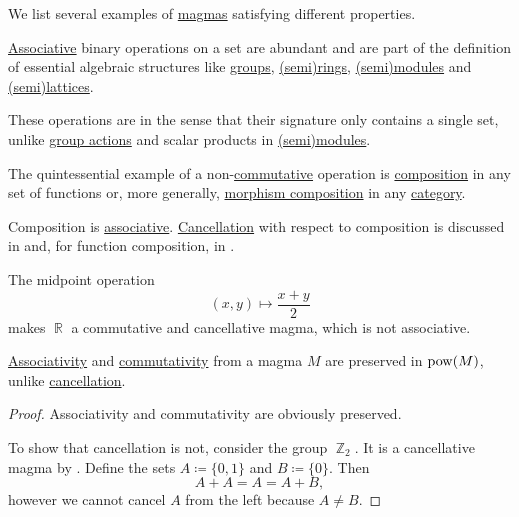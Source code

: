 \begin{example}\label{ex:def:magma}
  We list several examples of \hyperref[def:magma]{magmas} satisfying different properties.

  \begin{thmenum}
     \hyperref[eq:def:magma/associative]{Associative} binary operations on a set are abundant and are part of the definition of essential algebraic structures like \hyperref[def:group]{groups}, \hyperref[def:semiring]{(semi)rings}, \hyperref[def:semimodule]{(semi)modules} and \hyperref[def:semilattice]{(semi)lattices}.

    These operations are  in the sense that their signature only contains a single set, unlike \hyperref[def:group_action]{group actions} and scalar products in \hyperref[def:semimodule]{(semi)modules}.

     The quintessential example of a non-\hyperref[def:magma/commutative]{commutative} operation is \hyperref[def:multi_valued_function/composition]{composition} in any set of functions or, more generally, \hyperref[def:category/composition]{morphism composition} in any \hyperref[def:category]{category}.

    Composition is \hyperref[def:magma/associative]{associative}. \hyperref[def:magma/cancellative]{Cancellation} with respect to composition is discussed in  and, for function composition, in .

     The midpoint operation
    \begin{equation*}
      (x, y) \mapsto \dfrac {x + y} 2
    \end{equation*}
    makes \( \BbbR \) a commutative and cancellative magma, which is not associative.
  \end{thmenum}
\end{example}

\begin{proposition}\label{thm:power_set_magma_preservation}
  \hyperref[def:magma/associative]{Associativity} and \hyperref[def:magma/commutative]{commutativity} from a magma \( M \) are preserved in \( \operatorname{pow}(M) \), unlike \hyperref[def:magma/cancellative]{cancellation}.
\end{proposition}
\begin{proof}
  Associativity and commutativity are obviously preserved.

  To show that cancellation is not, consider the group \hyperref[thm:group_of_integers_modulo]{\( \BbbZ_2 \)}. It is a cancellative magma by . Define the sets \( A \coloneqq \{ 0, 1 \} \) and \( B \coloneqq \{ 0 \} \). Then
  \begin{equation*}
    A + A = A = A + B,
  \end{equation*}
  however we cannot cancel \( A \) from the left because \( A \neq B \).
\end{proof}

